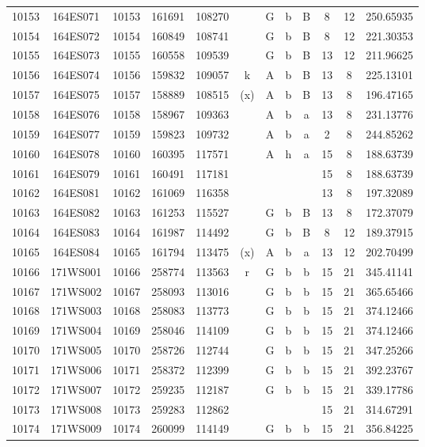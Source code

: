 \begin{tabular}{|*{12}{c|}}
10153 & 164ES071 & 10153 & 161691 & 108270 &  & G & b & B & 8 & 12 & 250.65935 \\ 
10154 & 164ES072 & 10154 & 160849 & 108741 &  & G & b & B & 8 & 12 & 221.30353 \\ 
10155 & 164ES073 & 10155 & 160558 & 109539 &  & G & b & B & 13 & 12 & 211.96625 \\ 
10156 & 164ES074 & 10156 & 159832 & 109057 & k & A & b & B & 13 & 8 & 225.13101 \\ 
10157 & 164ES075 & 10157 & 158889 & 108515 & (x) & A & b & B & 13 & 8 & 196.47165 \\ 
10158 & 164ES076 & 10158 & 158967 & 109363 &  & A & b & a & 13 & 8 & 231.13776 \\ 
10159 & 164ES077 & 10159 & 159823 & 109732 &  & A & b & a & 2 & 8 & 244.85262 \\ 
10160 & 164ES078 & 10160 & 160395 & 117571 &  & A & h & a & 15 & 8 & 188.63739 \\ 
10161 & 164ES079 & 10161 & 160491 & 117181 &  &  &  &  & 15 & 8 & 188.63739 \\ 
10162 & 164ES081 & 10162 & 161069 & 116358 &  &  &  &  & 13 & 8 & 197.32089 \\ 
10163 & 164ES082 & 10163 & 161253 & 115527 &  & G & b & B & 13 & 8 & 172.37079 \\ 
10164 & 164ES083 & 10164 & 161987 & 114492 &  & G & b & B & 8 & 12 & 189.37915 \\ 
10165 & 164ES084 & 10165 & 161794 & 113475 & (x) & A & b & a & 13 & 12 & 202.70499 \\ 
10166 & 171WS001 & 10166 & 258774 & 113563 & r & G & b & b & 15 & 21 & 345.41141 \\ 
10167 & 171WS002 & 10167 & 258093 & 113016 &  & G & b & b & 15 & 21 & 365.65466 \\ 
10168 & 171WS003 & 10168 & 258083 & 113773 &  & G & b & b & 15 & 21 & 374.12466 \\ 
10169 & 171WS004 & 10169 & 258046 & 114109 &  & G & b & b & 15 & 21 & 374.12466 \\ 
10170 & 171WS005 & 10170 & 258726 & 112744 &  & G & b & b & 15 & 21 & 347.25266 \\ 
10171 & 171WS006 & 10171 & 258372 & 112399 &  & G & b & b & 15 & 21 & 392.23767 \\ 
10172 & 171WS007 & 10172 & 259235 & 112187 &  & G & b & b & 15 & 21 & 339.17786 \\ 
10173 & 171WS008 & 10173 & 259283 & 112862 &  &  &  &  & 15 & 21 & 314.67291 \\ 
10174 & 171WS009 & 10174 & 260099 & 114149 &  & G & b & b & 15 & 21 & 356.84225 \\ 

\end{tabular}
